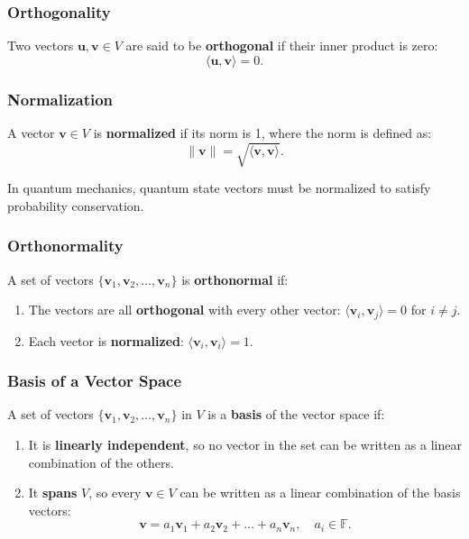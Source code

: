 \subsubsection{Orthogonality}

Two vectors \( \mathbf{u}, \mathbf{v} \in V \) are said to be \textbf{orthogonal} if their inner product is zero:
\[
\langle \mathbf{u}, \mathbf{v} \rangle = 0.
\]



\subsubsection{Normalization}
A vector \( \mathbf{v} \in V \) is \textbf{normalized} if its norm is 1, where the norm is defined as:
\begin{equation}
\|\mathbf{v}\| = \sqrt{\langle \mathbf{v}, \mathbf{v} \rangle}.
\end{equation}

\noindent In quantum mechanics, quantum state vectors must be normalized to satisfy probability conservation.

\subsubsection{Orthonormality}
A set of vectors \( \{\mathbf{v}_1, \mathbf{v}_2, \dots, \mathbf{v}_n\} \) is \textbf{orthonormal} if:
\begin{enumerate}
    \item The vectors are all \textbf{orthogonal} with every other vector: \( \langle \mathbf{v}_i, \mathbf{v}_j \rangle = 0 \) for \( i \neq j \).
    \item Each vector is \textbf{normalized}: \( \langle \mathbf{v}_i, \mathbf{v}_i \rangle = 1 \).
\end{enumerate}


\subsubsection{Basis of a Vector Space}
A set of vectors \( \{\mathbf{v}_1, \mathbf{v}_2, \dots, \mathbf{v}_n\} \) in \( V \) is a \textbf{basis} of the vector space if:
\begin{enumerate}
    \item It is \textbf{linearly independent}, so no vector in the set can be written as a linear combination of the others.
    \item It \textbf{spans} \( V \), so every \( \mathbf{v} \in V \) can be written as a linear combination of the basis vectors:
    \[
    \mathbf{v} = a_1 \mathbf{v}_1 + a_2 \mathbf{v}_2 + \dots + a_n \mathbf{v}_n, \quad a_i \in \mathbb{F}.
    \]
\end{enumerate}


